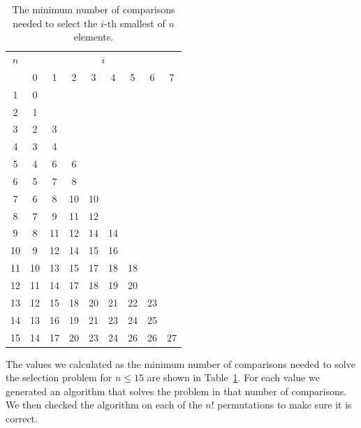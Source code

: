 \documentclass[twoside,leqno,twocolumn]{article}
\begin{document}
\begin{table}[!t]
  \renewcommand{\arraystretch}{1.2}
  \caption{The minimum number of comparisons needed to select the $i$-th smallest of $n$ elements.}
  \label{table:num-comparisons}
  \centering
  \begin{tabular}{c|cccccccc}
    $n$ & \multicolumn{8}{c}{$i$}                                    \\
        & 0                       & 1  & 2  & 3  & 4  & 5  & 6  & 7  \\ \hline
    1   & 0                                                          \\
    2   & 1                                                          \\
    3   & 2                       & 3                                \\
    4   & 3                       & 4                                \\
    5   & 4                       & 6  & 6                           \\
    6   & 5                       & 7  & 8                           \\
    7   & 6                       & 8  & 10 & 10                     \\
    8   & 7                       & 9  & 11 & 12                     \\
    9   & 8                       & 11 & 12 & 14 & 14                \\
    10  & 9                       & 12 & 14 & 15 & 16                \\
    11  & 10                      & 13 & 15 & 17 & 18 & 18           \\
    12  & 11                      & 14 & 17 & 18 & 19 & 20           \\
    13  & 12                      & 15 & 18 & 20 & 21 & 22 & 23      \\
    14  & 13                      & 16 & 19 & 21 & 23 & 24 & 25      \\
    15  & 14                      & 17 & 20 & 23 & 24 & 26 & 26 & 27 \\
  \end{tabular}
\end{table}

The values we calculated as the minimum number of comparisons needed to solve the selection problem for $n \leq 15$ are shown in Table~\ref{table:num-comparisons}.
For each value we generated an algorithm that solves the problem in that number of comparisons.
We then checked the algorithm on each of the $n!$ permutations to make sure it is correct.
\end{document}
